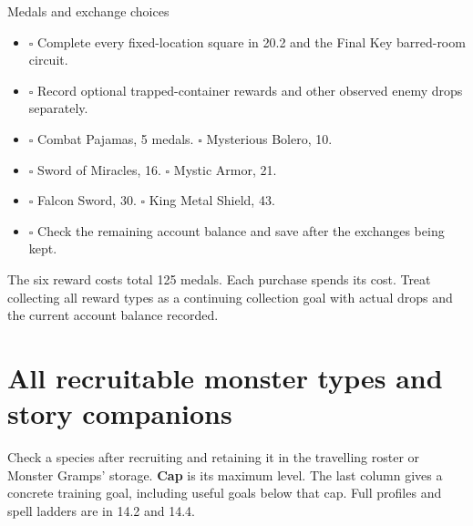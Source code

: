 \begin{routecheck}[breakable=false]{Medals and exchange choices}
\begin{itemize}
\item \(\square\) Complete every fixed-location square in 20.2 and the Final Key barred-room circuit.
\item \(\square\) Record optional trapped-container rewards and other observed enemy drops separately.
\item \(\square\) Combat Pajamas, 5 medals. \(\square\) Mysterious Bolero, 10.
\item \(\square\) Sword of Miracles, 16. \(\square\) Mystic Armor, 21.
\item \(\square\) Falcon Sword, 30. \(\square\) King Metal Shield, 43.
\item \(\square\) Check the remaining account balance and save after the exchanges being kept.
\end{itemize}
\end{routecheck}

The six reward costs total 125 medals. Each purchase spends its cost.
Treat collecting all reward types as a continuing collection goal with
actual drops and the current account balance recorded.

\section{All recruitable monster types and story companions}
\label{completion-species}

Check a species after recruiting and retaining it in the travelling
roster or Monster Gramps' storage. \textbf{Cap} is its maximum level.
The last column gives a concrete training goal, including useful goals
below that cap. Full profiles and spell ladders are in 14.2 and 14.4.

